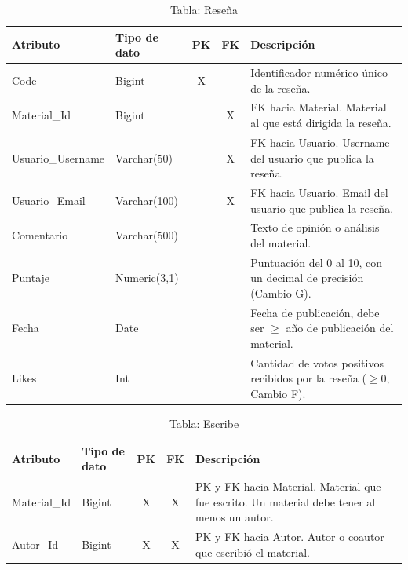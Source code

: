 \documentclass[12pt,a4paper]{article}
\begin{document}
\begin{table}[H]
\centering
\begin{tabularx}{\textwidth}{|l|l|c|c|X|}
\hline
\textbf{Atributo} & \textbf{Tipo de dato} & \textbf{PK} & \textbf{FK} & \textbf{Descripción} \\ \hline
Code             & Bigint        & X & & Identificador numérico único de la reseña. \\ \hline
Material\_Id     & Bigint        & & X & FK hacia Material. Material al que está dirigida la reseña. \\ \hline
Usuario\_Username & Varchar(50)  & & X & FK hacia Usuario. Username del usuario que publica la reseña. \\ \hline
Usuario\_Email   & Varchar(100)  & & X & FK hacia Usuario. Email del usuario que publica la reseña. \\ \hline
Comentario       & Varchar(500)  & & & Texto de opinión o análisis del material. \\ \hline
Puntaje          & Numeric(3,1)  & & & Puntuación del 0 al 10, con un decimal de precisión (Cambio G). \\ \hline
Fecha            & Date          & & & Fecha de publicación, debe ser $\geq$ año de publicación del material. \\ \hline
Likes            & Int           & & & Cantidad de votos positivos recibidos por la reseña ($\geq 0$, Cambio F). \\ \hline
\end{tabularx}
\caption{Tabla: Reseña}
\end{table}

\begin{table}[H]
\centering
\begin{tabularx}{\textwidth}{|l|l|c|c|X|}
\hline
\textbf{Atributo} & \textbf{Tipo de dato} & \textbf{PK} & \textbf{FK} & \textbf{Descripción} \\ \hline
Material\_Id & Bigint & X & X & PK y FK hacia Material. Material que fue escrito. Un material debe tener al menos un autor. \\ \hline
Autor\_Id    & Bigint & X & X & PK y FK hacia Autor. Autor o coautor que escribió el material. \\ \hline
\end{tabularx}
\caption{Tabla: Escribe}
\end{table}
\end{document}
